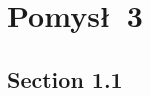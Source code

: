 \documentclass[module]{subfiles}
\begin{document}
\clearpage

\part{Pomys\l\ 3}

\chapter{Section 1.1}

\lipsum[1]
\end{document}
